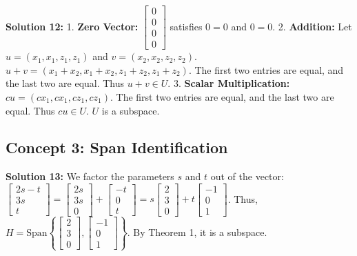 \documentclass[11pt]{article}
\begin{document}
\vspace{0.3cm}
\textbf{Solution 12:}
1. \textbf{Zero Vector:} $\begin{bmatrix} 0 \\ 0 \\ 0 \\ 0 \end{bmatrix}$ satisfies $0=0$ and $0=0$.
2. \textbf{Addition:} Let $u = (x_1, x_1, z_1, z_1)$ and $v = (x_2, x_2, z_2, z_2)$. $u+v = (x_1+x_2, x_1+x_2, z_1+z_2, z_1+z_2)$. The first two entries are equal, and the last two are equal. Thus $u+v \in U$.
3. \textbf{Scalar Multiplication:} $cu = (cx_1, cx_1, cz_1, cz_1)$. The first two entries are equal, and the last two are equal. Thus $cu \in U$. $U$ is a subspace.

\subsection*{Concept 3: Span Identification}

\textbf{Solution 13:}
We factor the parameters $s$ and $t$ out of the vector:
$\begin{bmatrix} 2s - t \\ 3s \\ t \end{bmatrix} = \begin{bmatrix} 2s \\ 3s \\ 0 \end{bmatrix} + \begin{bmatrix} -t \\ 0 \\ t \end{bmatrix} = s\begin{bmatrix} 2 \\ 3 \\ 0 \end{bmatrix} + t\begin{bmatrix} -1 \\ 0 \\ 1 \end{bmatrix}$.
Thus, $H = \text{Span}\left\{ \begin{bmatrix} 2 \\ 3 \\ 0 \end{bmatrix}, \begin{bmatrix} -1 \\ 0 \\ 1 \end{bmatrix} \right\}$. By Theorem 1, it is a subspace.
\end{document}

